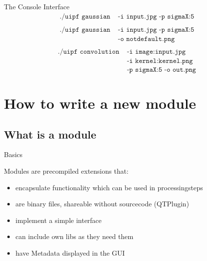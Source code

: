 \documentclass{beamer}
\begin{document}
\begin{frame}{The Console Interface}
\Large
	\begin{align*}
		\texttt{./uipf gaussian} & \texttt{ -i input.jpg -p sigmaX:5} \\
	\end{align*}
	\vspace{-1.5cm}\pause
	\begin{align*}
		\texttt{./uipf gaussian} & \texttt{ -i input.jpg -p sigmaX:5} \\
								 & \texttt{ -o notdefault.png}\\
	\end{align*}
	\vspace{-1.5cm}\pause
	\begin{align*}
		\texttt{./uipf convolution} & \texttt{ -i image:input.jpg} \\
									& \texttt{ -i kernel:kernel.png} \\
									& \texttt{ -p sigmaX:5 -o out.png}
	\end{align*}

\end{frame}


\section{How to write a new module}

\subsection{What is a module}
\begin{frame}[fragile]{Basics}

Modules are precompiled extensions that:
	\begin{itemize}
		\item encapsulate functionality which can be used in processingsteps
		\item are binary files, shareable without sourcecode (QTPlugin)
		\item implement a simple interface
		\item can include own libs as they need them
		\item have Metadata displayed in the GUI
	\end{itemize}

\end{frame}
\end{document}
